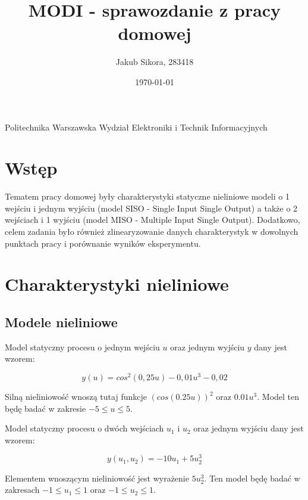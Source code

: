 \documentclass[11pt,a4paper]{article}
\title{MODI - sprawozdanie z pracy domowej}
\author{Jakub Sikora, 283418}
\date{\today}
\begin{document}
\maketitle
\begin{center}
Politechnika Warszawska\linebreak 
Wydział Elektroniki i Technik Informacyjnych
\end{center}
\newpage
\tableofcontents
\newpage

\section{Wstęp}\label{sec:Wstęp}
\indent \indent Tematem pracy domowej były charakterystyki statyczne nieliniowe modeli o 1 wejściu i jednym wyjściu (model SISO - Single Input Single Output) a także o 2 wejściach i 1 wyjściu (model MISO - Multiple Input Single Output). Dodatkowo, celem zadania było również zlinearyzowanie danych charakterystyk w dowolnych punktach pracy i porównanie wyników eksperymentu.

\section{Charakterystyki nieliniowe}\label{sec:Charakterystki nieliniowe}
\subsection{Modele nieliniowe}
\indent \indent Model statyczny procesu o jednym wejściu $u$ oraz jednym wyjściu $y$ dany jest wzorem:

\begin{equation}
    y(u) = cos^2(0,25u) - 0,01u^3 - 0,02
    \label{eqn:wzor1}
\end{equation}


Silną nieliniowość wnoszą tutaj funkcje $(cos(0.25u))^2$ oraz $0.01u^3$. Model ten będę badać w zakresie $-5 \le u \le 5$.
\newline 

\indent Model statyczny procesu o dwóch wejściach $u_{1}$ i $u_{2}$ oraz jednym wyjściu dany jest wzorem:

\begin{equation}
	y(u_1, u_2) = -10u_{1} + 5u_{2}^3
	\label{eqn:wzor2}
\end{equation}

Elementem wnoszącym nieliniowość jest wyrażenie $5u_2^3$. Ten model będę badać w zakresach $-1 \le u_{1} \le 1$ oraz $ -1 \le u_{2} \le 1 $. 
\end{document}
